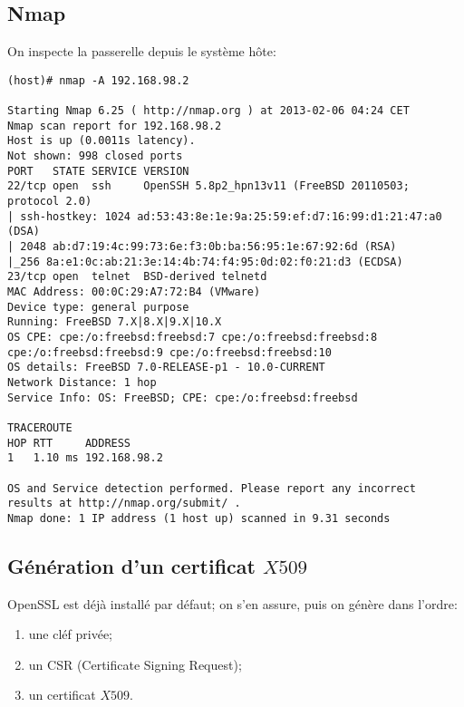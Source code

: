 \subsection{Nmap}
On inspecte la passerelle depuis le système hôte:
\begin{verbatim}
(host)# nmap -A 192.168.98.2

Starting Nmap 6.25 ( http://nmap.org ) at 2013-02-06 04:24 CET
Nmap scan report for 192.168.98.2
Host is up (0.0011s latency).
Not shown: 998 closed ports
PORT   STATE SERVICE VERSION
22/tcp open  ssh     OpenSSH 5.8p2_hpn13v11 (FreeBSD 20110503; protocol 2.0)
| ssh-hostkey: 1024 ad:53:43:8e:1e:9a:25:59:ef:d7:16:99:d1:21:47:a0 (DSA)
| 2048 ab:d7:19:4c:99:73:6e:f3:0b:ba:56:95:1e:67:92:6d (RSA)
|_256 8a:e1:0c:ab:21:3e:14:4b:74:f4:95:0d:02:f0:21:d3 (ECDSA)
23/tcp open  telnet  BSD-derived telnetd
MAC Address: 00:0C:29:A7:72:B4 (VMware)
Device type: general purpose
Running: FreeBSD 7.X|8.X|9.X|10.X
OS CPE: cpe:/o:freebsd:freebsd:7 cpe:/o:freebsd:freebsd:8 cpe:/o:freebsd:freebsd:9 cpe:/o:freebsd:freebsd:10
OS details: FreeBSD 7.0-RELEASE-p1 - 10.0-CURRENT
Network Distance: 1 hop
Service Info: OS: FreeBSD; CPE: cpe:/o:freebsd:freebsd

TRACEROUTE
HOP RTT     ADDRESS
1   1.10 ms 192.168.98.2

OS and Service detection performed. Please report any incorrect results at http://nmap.org/submit/ .
Nmap done: 1 IP address (1 host up) scanned in 9.31 seconds
\end{verbatim}

\subsection{Génération d'un certificat $X509$}
OpenSSL est déjà installé par défaut; on s'en assure, puis on génère
dans l'ordre:
\begin{enumerate}
	\item une cléf privée;
	\item un CSR (Certificate Signing Request);
	\item un certificat $X509$.
\end{enumerate}


